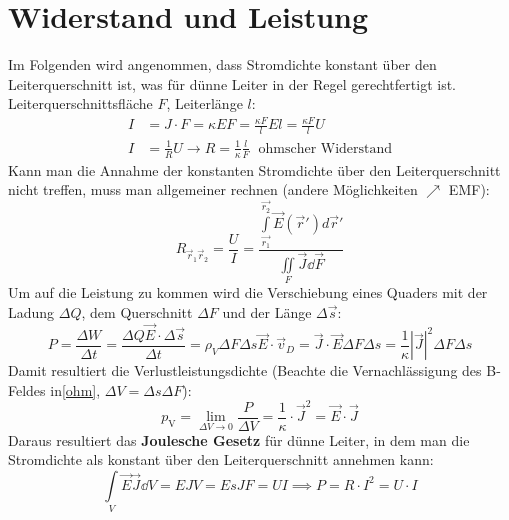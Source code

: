 \section{Widerstand und Leistung}
Im Folgenden wird angenommen, dass Stromdichte konstant über den Leiterquerschnitt ist, was für dünne Leiter in der Regel gerechtfertigt ist.
Leiterquerschnittsfläche $F$, Leiterlänge $l$:
\begin{equation}\begin{split}
		I&=J\cdot F =\kappa E F = \frac{\kappa F}{l} El = \frac{\kappa F}{l} U\\
		I&= \frac{1}{R} U \to \boxed{R = \frac{1}{\kappa} \frac{l}{F}}\;\text{ ohmscher Widerstand}
\end{split}\end{equation}
Kann man die Annahme der konstanten Stromdichte über den Leiterquerschnitt nicht treffen, muss man allgemeiner rechnen (andere Möglichkeiten $\nearrow$ EMF):
\begin{equation}
	R_{\vec{r}_1\vec{r}_2} = \frac{U}{I} = \frac{\int\limits_{\vec{r_1}}^{\vec{r_2}} \vec{E}(\vec{r}')   d\vec{r}'}{\iint\limits_F \vec{J}   \dd\vec{F}}
\end{equation}
Um auf die Leistung zu kommen wird die Verschiebung eines Quaders mit der Ladung $\Delta Q$, dem Querschnitt $\Delta F$ und der Länge $\Delta\vec{s}$:
$$
P = \frac{\Delta W}{\Delta t} = \frac{\Delta Q \vec{E}\cdot \Delta\vec{s}}{\Delta t}
= \rho_V\Delta F\Delta s \vec{E}\cdot\vec{v}_D = \vec{J}\cdot \vec{E} \Delta F\Delta s = \frac{1}{\kappa}|\vec{J}|^2\Delta F\Delta s$$
Damit resultiert die Verlustleistungsdichte (Beachte die Vernachlässigung des B-Feldes in\ref{ohm}, $\Delta V=\Delta s \Delta F$):
\begin{equation}\label{verlustleist}
	\boxed{p_\text{V} = \lim\limits_{\Delta V \rightarrow 0} \dfrac{ P}{\Delta V} = \dfrac{1}{\kappa} \cdot \vec{J}^2 = \vec{E} \cdot \vec{J}}
\end{equation}
Daraus resultiert das \textbf{Joulesche Gesetz} für dünne Leiter, in dem man die Stromdichte als konstant über den Leiterquerschnitt annehmen kann:
\begin{equation}
	\int\limits_V\vec{E}\vec{J}\dd V = EJV= EsJF = UI \implies \boxed{ P =  R \cdot  I^2 =  U \cdot  I}
\end{equation}
